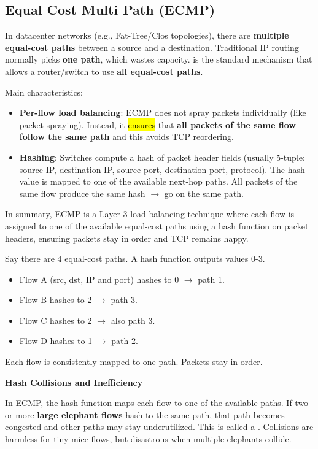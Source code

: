 \subsection{Equal Cost Multi Path (ECMP)}

In datacenter networks (e.g., Fat-Tree/Clos topologies), there are \textbf{multiple equal-cost paths} between a source and a destination. Traditional IP routing normally picks \textbf{one path}, which wastes capacity.  is the standard mechanism that allows a router/switch to use \textbf{all equal-cost paths}.

\highspace
Main characteristics:
\begin{itemize}
    \item \textbf{Per-flow load balancing}: ECMP does not spray packets individually (like packet spraying). Instead, it \hl{ensures} that \textbf{all packets of the same flow follow the same path} and this avoids TCP reordering.
    \item \textbf{Hashing}: Switches compute a hash of packet header fields (usually 5-tuple: source IP, destination IP, source port, destination port, protocol). The hash value is mapped to one of the available next-hop paths. All packets of the same flow produce the same hash $\rightarrow$ go on the same path.
\end{itemize}
In summary, ECMP is a Layer 3 load balancing technique where each flow is assigned to one of the available equal-cost paths using a hash function on packet headers, ensuring packets stay in order and TCP remains happy.

\begin{examplebox}
    Say there are 4 equal-cost paths. A hash function outputs values 0-3.
    \begin{itemize}
        \item Flow A (src, dst, IP and port) hashes to 0 $\rightarrow$ path 1.
        \item Flow B hashes to 2 $\rightarrow$ path 3.
        \item Flow C hashes to 2 $\rightarrow$ also path 3.
        \item Flow D hashes to 1 $\rightarrow$ path 2.
    \end{itemize}
    Each flow is consistently mapped to one path. Packets stay in order.
\end{examplebox}

\highspace
\begin{flushleft}
    \textcolor{Red2}{ \textbf{Hash Collisions and Inefficiency}}
\end{flushleft}
In ECMP, the hash function maps each flow to one of the available paths. If two or more \textbf{large elephant flows} hash to the same path, that path becomes congested and other paths may stay underutilized. This is called a . Collisions are harmless for tiny mice flows, but disastrous when multiple elephants collide.

